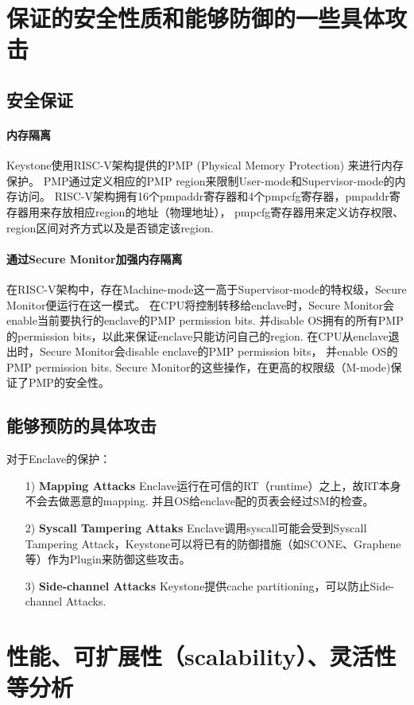 \section{保证的安全性质和能够防御的一些具体攻击}
\subsection{安全保证}
\paragraph{内存隔离}
Keystone使用RISC-V架构提供的PMP (Physical Memory Protection) 来进行内存保护。
PMP通过定义相应的PMP region来限制User-mode和Supervisor-mode的内存访问。
RISC-V架构拥有16个pmpaddr寄存器和4个pmpcfg寄存器，pmpaddr寄存器用来存放相应region的地址（物理地址），
pmpcfg寄存器用来定义访存权限、region区间对齐方式以及是否锁定该region.
\paragraph{通过Secure Monitor加强内存隔离}
在RISC-V架构中，存在Machine-mode这一高于Supervisor-mode的特权级，Secure Monitor便运行在这一模式。
在CPU将控制转移给enclave时，Secure Monitor会enable当前要执行的enclave的PMP permission bits. 
并disable OS拥有的所有PMP的permission bits，以此来保证enclave只能访问自己的region.
在CPU从enclave退出时，Secure Monitor会disable enclave的PMP permission bits，
并enable OS的PMP permission bits.
Secure Monitor的这些操作，在更高的权限级（M-mode)保证了PMP的安全性。

\subsection{能够预防的具体攻击}
对于Enclave的保护：
\begin{itemize}
	\item [1)]
	\textbf{Mapping Attacks} Enclave运行在可信的RT（runtime）之上，故RT本身不会去做恶意的mapping. 并且OS给enclave配的页表会经过SM的检查。
	\item [2)]
	\textbf{Syscall Tampering Attaks} Enclave调用syscall可能会受到Syscall Tampering Attack，Keystone可以将已有的防御措施（如SCONE、Graphene等）作为Plugin来防御这些攻击。
	\item [3)]
	\textbf{Side-channel Attacks} Keystone提供cache partitioning，可以防止Side-channel Attacks.
\end{itemize}

\section{性能、可扩展性（scalability）、灵活性等分析}
